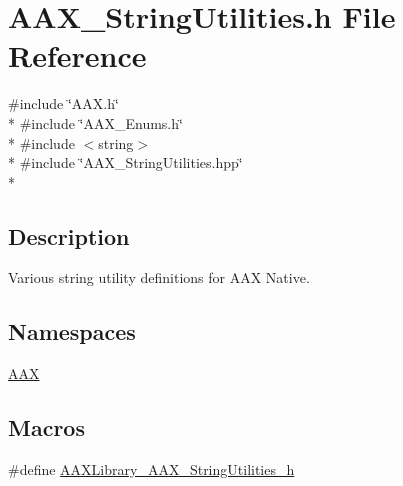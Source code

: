 \hypertarget{a00296}{}\section{A\+A\+X\+\_\+\+String\+Utilities.\+h File Reference}
\label{a00296}
{\ttfamily \#include \char`\"{}A\+A\+X.\+h\char`\"{}}\\*
{\ttfamily \#include \char`\"{}A\+A\+X\+\_\+\+Enums.\+h\char`\"{}}\\*
{\ttfamily \#include $<$string$>$}\\*
{\ttfamily \#include \char`\"{}A\+A\+X\+\_\+\+String\+Utilities.\+hpp\char`\"{}}\\*


\subsection{Description}
Various string utility definitions for A\+A\+X Native. 

\subsection*{Namespaces}
\begin{DoxyCompactItemize}
\item 
 \hyperlink{a00288}{A\+A\+X}
\end{DoxyCompactItemize}
\subsection*{Macros}
\begin{DoxyCompactItemize}
\item 
\#define \hyperlink{a00296_aea61cbef0d0ebbae3c538af4531460df}{A\+A\+X\+Library\+\_\+\+A\+A\+X\+\_\+\+String\+Utilities\+\_\+h}
\end{DoxyCompactItemize}
